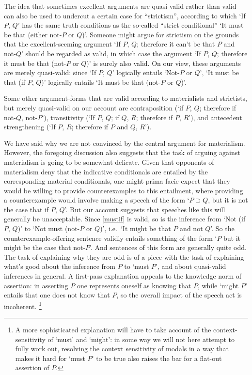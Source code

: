 \documentclass[If.tex]{subfiles}
\begin{document}


The idea that sometimes excellent arguments are quasi-valid rather than valid can also be used to undercut a certain case for “strictism”, according to which ‘If $P$, $Q$’ has the same truth conditions as the so-called “strict conditional” ‘It must be that (either not-$P$ or $Q$)’. Someone might argue for strictism on the grounds that the excellent-seeming argument ‘If $P$, $Q$; therefore it can't be that $P$ and not-$Q$’ should be regarded as valid, in which case the argument ‘If $P$, $Q$; therefore it must be that (not-$P$ or $Q$)’ is surely also valid. On our view, these arguments are merely quasi-valid: since ‘If $P$, $Q$’ logically entails ‘Not-$P$ or $Q$’, ‘It must be that (if $P$, $Q$)’ logically entails ‘It must be that (not-$P$ or $Q$)’.

Some other argument-forms that are valid according to materialists and strictists, but merely quasi-valid on our account are contraposition (‘if $P$, $Q$; therefore if not-$Q$, not-$P$’), transitivity (‘If $P$, $Q$; if $Q$, $R$; therefore if $P$, $R$’), and antecedent strengthening (‘If $P$, $R$; therefore if $P$ and $Q$, $R$’).

We have said why we are not convinced by the central argument for materialism.  However, the foregoing discussion also suggests that the task of arguing against materialism is going to be somewhat delicate.  Given that opponents of materialism deny that the indicative conditionals are entailed by the corresponding material conditionals, one might prima facie expect that they would be willing to provide counterexamples to this entailment, where providing a counterexample would involve making a speech of the form ‘$P ⊃ Q$, but it is not the case that if $P$, $Q$’.  But our account suggests that speeches like this will generally be unacceptable.  Since \ref{mustif} is valid, so is the inference from ‘Not (if $P$, $Q$)’ to ‘Not must (not-$P$ or $Q$)’, i.e.\ ‘It might be that $P$ and not $Q$’.  So the counterexample-offering sentence validly entails something of the form ‘$P$ but it might be the case that not-$P$’.  And sentences of this form are generally quite odd.  The task of explaining why they are odd is of a piece with the task of explaining what's good about the inference from $P$ to ‘must $P$’, and about quasi-valid inferences in general.  A first-pass explanation appeals to the knowledge norm of assertion: in asserting $P$ one represents oneself as knowing that $P$, while ‘might $P$’ entails that one does not know that $P$, so the overall impact of the speech act is incoherent.%
\footnote{A more sophisticated explanation will have to take account of the context-sensitivity of ‘must’ and ‘might’: in some way we will not here attempt to fully work out, resolving the context sensitivity of modals in a way that makes it hard for ‘must $P$’ to be true also raises the bar for a flat-out assertion of $P$.}
\end{document}
